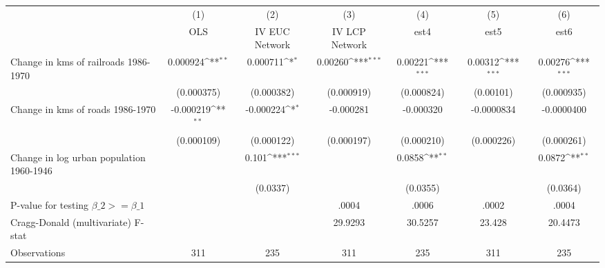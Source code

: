 {
\def\sym#1{\ifmmode^{#1}\else\(^{#1}\)\fi}
\begin{tabular}{l*{6}{c}}
\hline\hline
                &\multicolumn{1}{c}{(1)}&\multicolumn{1}{c}{(2)}&\multicolumn{1}{c}{(3)}&\multicolumn{1}{c}{(4)}&\multicolumn{1}{c}{(5)}&\multicolumn{1}{c}{(6)}\\
                &\multicolumn{1}{c}{OLS}&\multicolumn{1}{c}{IV EUC Network}&\multicolumn{1}{c}{IV LCP Network}&\multicolumn{1}{c}{est4}&\multicolumn{1}{c}{est5}&\multicolumn{1}{c}{est6}\\
\hline
Change in kms of railroads 1986-1970& 0.000924\sym{**} & 0.000711\sym{*}  &  0.00260\sym{***}&  0.00221\sym{***}&  0.00312\sym{***}&  0.00276\sym{***}\\
                &(0.000375)         &(0.000382)         &(0.000919)         &(0.000824)         &(0.00101)         &(0.000935)         \\
[1em]
Change in kms of roads 1986-1970&-0.000219\sym{**} &-0.000224\sym{*}  &-0.000281         &-0.000320         &-0.0000834         &-0.0000400         \\
                &(0.000109)         &(0.000122)         &(0.000197)         &(0.000210)         &(0.000226)         &(0.000261)         \\
[1em]
Change in log urban population 1960-1946&                  &    0.101\sym{***}&                  &   0.0858\sym{**} &                  &   0.0872\sym{**} \\
                &                  & (0.0337)         &                  & (0.0355)         &                  & (0.0364)         \\
\hline
P-value for testing $\beta\_{2} >= \beta\_{1}$&                  &                  &    .0004         &    .0006         &    .0002         &    .0004         \\
Cragg-Donald (multivariate) F-stat&                  &                  &  29.9293         &  30.5257         &   23.428         &  20.4473         \\
Observations    &      311         &      235         &      311         &      235         &      311         &      235         \\
\hline\hline
\end{tabular}
}
